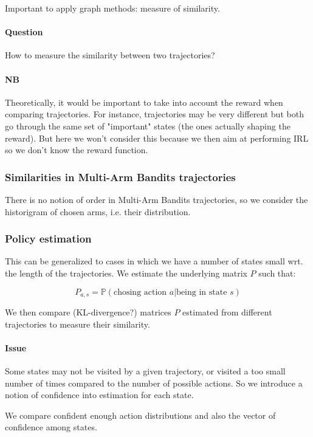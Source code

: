 \documentclass{article}
\begin{document}
Important to apply graph methods: measure of similarity.

\paragraph{Question}
How to measure the similarity between two trajectories?

\paragraph{NB} Theoretically, it would be important to take into account the reward when comparing trajectories. For instance, trajectories may be very different but both go through the same set of "important" states (the ones actually shaping the reward). But here we won't consider this because we then aim at performing IRL so we don't know the reward function.

\subsubsection{Similarities in Multi-Arm Bandits trajectories}

There is no notion of order in Multi-Arm Bandits trajectories, so we consider the historigram of chosen arms, i.e. their distribution.

\subsubsection{Policy estimation}

This can be generalized to cases in which we have a number of states small wrt. the length of the trajectories. We estimate the underlying matrix $P$ such that:

\[
P_{a,s} = \mathbb P(\text{chosing action } a | \text{being in state } s)
\]

We then compare (KL-divergence?) matrices $P$ estimated from different trajectories to measure their similarity.

\paragraph{Issue} Some states may not be visited by a given trajectory, or visited a too small number of times compared to the number of possible actions. So we introduce a notion of confidence into estimation for each state.

We compare confident enough action distributions and also the vector of confidence among states.
\end{document}
